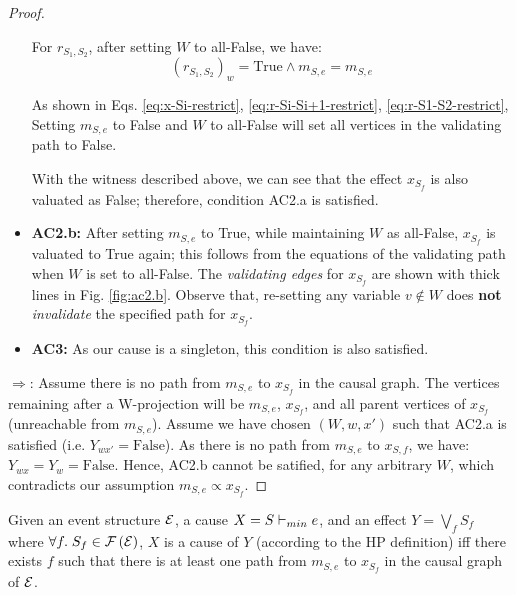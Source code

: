 \begin{proof}
\begin{itemize}
  For $r_{S_1,S_2}$, after setting $W$ to all-False, we have:
  \begin{equation}\label{eq:r-S1-S2-restrict}
    (r_{S_1,S_2})_w = \text{True} \wedge m_{S,e} = m_{S,e}
  \end{equation}
  
  

  As shown in Eqs.
  \ref{eq:x-Si-restrict}, \ref{eq:r-Si-Si+1-restrict}, \ref{eq:r-S1-S2-restrict},
  Setting $m_{S,e}$ to False and $W$ to all-False will set all vertices
  in the validating path to False.

  With the witness described above, we can see that the effect $x_{S_f}$
  is also valuated as False; therefore, condition AC2.a is satisfied.
  
  
  \item \textbf{AC2.b:} After setting $m_{S,e}$ to True,
  while maintaining $W$ as all-False, $x_{S_f}$ is valuated to True again;
  this follows from the equations of the validating path when $W$ is set to all-False.
  The \textit{validating edges} for $x_{S_f}$ are shown with thick lines
  in Fig. \ref{fig:ac2.b}. Observe that, re-setting any variable $v \not\in W$
  does \textbf{not} \textit{invalidate} the specified path for $x_{S_f}$.

  

  \item \textbf{AC3:} As our cause is a singleton,
  this condition is also satisfied.
\end{itemize}

$\Rightarrow$: Assume there is no path from $m_{S,e}$ to $x_{S_f}$
in the causal graph. The vertices remaining after a W-projection will be
$m_{S,e}$, $x_{S_f}$, and all parent vertices of $x_{S_f}$ (unreachable from $m_{S,e}$).
Assume we have chosen $(W, w, x')$ such that AC2.a is satisfied
(i.e. $Y_{wx'} = \text{False}$).
As there is no path from $m_{S,e}$ to $x_{S,f}$, we have: $Y_{wx} = Y_{w} = \text{False}$.
Hence, AC2.b cannot be satified, for any arbitrary $W$, which contradicts our assumption
$m_{S,e} \propto x_{S_f}$.

\end{proof}

\begin{thm}\label{thm:hp-x-disj-Y}
Given an event structure $\mathcal{E}$, a cause $X = S \vdash_{min} e$,
and an effect $Y = \bigvee_{f} S_{f}$
where $\forall f.\;S_f \in \mathcal{F} \left( \mathcal{E} \right)$, $X$ is a cause of $Y$
(according to the HP definition) iff there exists $f$ such that
there is at least one path from $m_{S,e}$ to $x_{S_f}$
in the causal graph of $\mathcal{E}$.
\end{thm}

